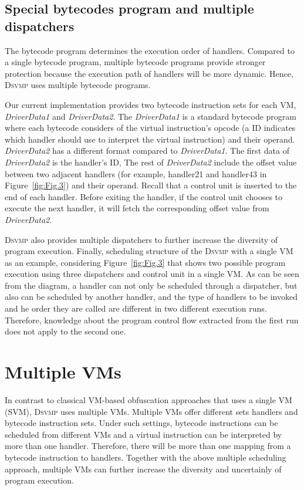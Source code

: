 \documentclass[times]{secauth}
\newcommand{\DSVMP}{\textsc{Dsvmp }}
\begin{document}
\subsection{Special bytecodes program and multiple dispatchers \label{sec:mbd}}
The bytecode program determines the execution order of handlers. Compared to a single bytecode program,
multiple bytecode programs provide stronger protection because the execution path of handlers will be more dynamic.
Hence, \DSVMP uses multiple bytecode programs.

Our current implementation provides two bytecode instruction sets for each VM,
\emph{DriverData1} and \emph{DriverData2}. The \emph{DriverData1} is a
standard bytecode program where each bytecode considers of the
virtual instruction's opcode (a ID indicates which handler should use to
interpret the virtual instruction) and their operand. \emph{DriverData2} has a different
format compared to \emph{DriverData1}. The first data of \emph{DriverData2}
is the handler's ID, The rest of \emph{DriverData2} include the
offset value between two adjacent handlers (for example, handler21 and handler43 in Figure~\ref{fig:Fig.3}) and their operand.
Recall that a control unit is inserted to the end of each handler. Before exiting the handler,
if the control unit chooses to execute the next handler, it will fetch the corresponding offset value from \emph{DriverData2}.


\DSVMP also provides multiple dispatchers to further increase the diversity of program execution.
Finally, scheduling structure of the \DSVMP with a single VM as an example, considering Figure~\ref{fig:Fig.3} that
shows two possible program execution using three dispatchers and control unit in a single VM. As can be seen
from the diagram, a handler can not only be scheduled through a dispatcher, but also can be scheduled by another handler,
and the type of handlers to be invoked and he order they are called are different in two different execution runs.
Therefore, knowledge about the program control flow extracted from the first run does not apply to the second one.




\section{Multiple VMs \label{sec:mvm}}
In contrast to classical VM-based obfuscation approaches that uses a single VM (SVM), \DSVMP uses multiple VMs.
Multiple VMs offer different sets handlers and bytecode instruction sets. Under such settings,
bytecode instructions can be scheduled from different VMs and a virtual instruction can be interpreted by more than one handler.
Therefore, there will be more than one mapping from a bytecode instruction to handlers.
Together with the above multiple scheduling approach, multiple VMs can further increase the diversity and uncertainly of program execution.
\end{document}
